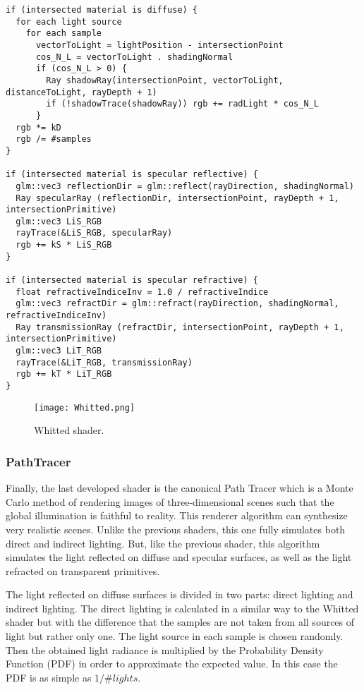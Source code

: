 \begin{lstlisting}[caption={Algorithm of Whitted Shader}, captionpos=b, label=Whitted]
if (intersected material is diffuse) {
  for each light source
    for each sample
      vectorToLight = lightPosition - intersectionPoint
      cos_N_L = vectorToLight . shadingNormal
      if (cos_N_L > 0) {
        Ray shadowRay(intersectionPoint, vectorToLight, distanceToLight, rayDepth + 1)
        if (!shadowTrace(shadowRay)) rgb += radLight * cos_N_L
      }
  rgb *= kD
  rgb /= #samples
}

if (intersected material is specular reflective) {
  glm::vec3 reflectionDir = glm::reflect(rayDirection, shadingNormal)
  Ray specularRay (reflectionDir, intersectionPoint, rayDepth + 1, intersectionPrimitive)
  glm::vec3 LiS_RGB
  rayTrace(&LiS_RGB, specularRay)
  rgb += kS * LiS_RGB
}

if (intersected material is specular refractive) {
  float refractiveIndiceInv = 1.0 / refractiveIndice
  glm::vec3 refractDir = glm::refract(rayDirection, shadingNormal, refractiveIndiceInv)
  Ray transmissionRay (refractDir, intersectionPoint, rayDepth + 1, intersectionPrimitive)
  glm::vec3 LiT_RGB
  rayTrace(&LiT_RGB, transmissionRay)
  rgb += kT * LiT_RGB
}
\end{lstlisting}

\begin{figure}[H]
	\centering
	\caption{Whitted shader.}
	\label{Whitted shader.}
	\texttt{[image: Whitted.png]}
\end{figure}


\subsubsection{PathTracer}

\par
Finally, the last developed shader is the canonical Path Tracer which is a Monte Carlo method of rendering images of three-dimensional scenes such that the global illumination is faithful to reality.
This renderer algorithm can synthesize very realistic scenes.
Unlike the previous shaders, this one fully simulates both direct and indirect lighting.
But, like the previous shader, this algorithm simulates the light reflected on diffuse and specular surfaces, as well as the light refracted on transparent primitives.

\par
The light reflected on diffuse surfaces is divided in two parts: direct lighting and indirect lighting.
The direct lighting is calculated in a similar way to the Whitted shader but with the difference that the samples are not taken from all sources of light but rather only one.
The light source in each sample is chosen randomly.
Then the obtained light radiance is multiplied by the Probability Density Function (PDF) in order to approximate the expected value.
In this case the PDF is as simple as
$1 / \#lights$.

